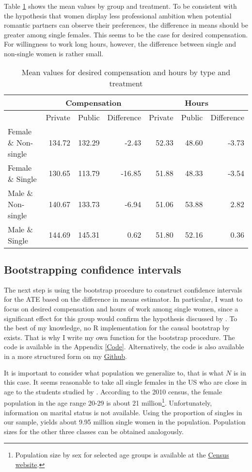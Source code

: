 \documentclass[aodsor,preprint]{imsart}
\numberwithin{equation}{section}
\theoremstyle{plain}
\begin{document}
Table \ref{mean values} shows the mean values by group and treatment. To be consistent with the hypothesis that women display less professional ambition when potential romantic partners can observe their preferences, the difference in means should be greater among single females. This seems to be the case for desired compensation. For willingness to work long hours, however, the difference between single and non-single women is rather small. 

\begin{table}[!h]
	\centering
	\caption{Mean values for desired compensation and hours by type and treatment}
	\label{mean values}
	\begin{tabular}{l|r|r|r|r|r|r}
		\hline
		& \multicolumn{3}{c|}{Compensation} & \multicolumn{3}{|c}{Hours} \\
		\hline
		& Private & Public & Difference & Private & Public & Difference \\
		\hline
		Female \& Non-single & 134.72 & 132.29 & -2.43 & 52.33 & 48.60 & -3.73\\
		Female \& Single & 130.65 & 113.79 & -16.85 & 51.88 & 48.33 & -3.54\\
		Male \& Non-single & 140.67 & 133.73 & -6.94 & 51.06 & 53.88 & 2.82\\
		Male \& Single & 144.69 & 145.31 & 0.62 & 51.80 & 52.16 & 0.36\\
		\hline
	\end{tabular}
\end{table}


\subsection{Bootstrapping confidence intervals}

The next step is using the bootstrap procedure to construct confidence intervals for the ATE based on the difference in means estimator. In particular, I want to focus on desired compensation and hours of work among single women, since a significant effect for this group would confirm the hypothesis discussed by \cite{Bursztyn_2017}. To the best of my knowledge, no R implementation for the causal bootstrap by \cite{Imbens_2021} exists. That is why I write my own function for the bootstrap procedure. The code is available in the Appendix \ref{Code}. Alternatively, the code is also available in a more structured form on my \href{https://github.com/gregorsteiner/CausalBootstrap}{Github}.

It is important to consider what population we generalize to, that is what $N$ is in this case. It seems reasonable to take all single females in the US who are close in age to the students studied by \cite{Bursztyn_2017}. According to the 2010 census, the female population in the age range 20-29 is about 21 million\footnote{Population size by sex for selected age groups is available at the \href{https://www.census.gov/data/tables/time-series/demo/popest/2010s-national-detail.html}{Census website}.}. Unfortunately, information on marital status is not available. Using the proportion of singles in our sample, yields about 9.95 million single women in the population. Population sizes for the other three classes can be obtained analogously.
\end{document}
